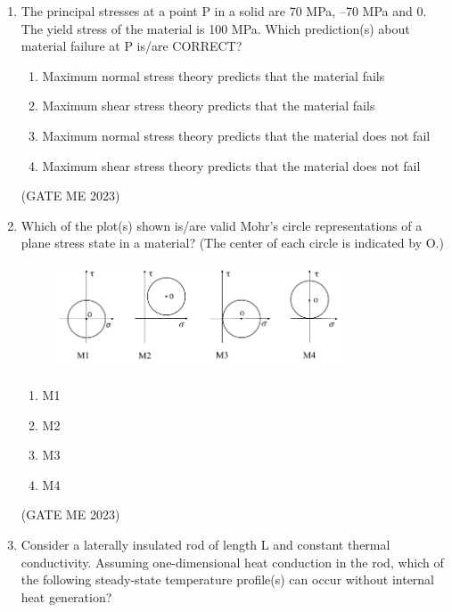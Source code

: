 \documentclass[journal]{IEEEtran}
\begin{document}
\begin{enumerate}
\item The principal stresses at a point P in a solid are 70 MPa, –70 MPa and 0. The yield stress of the material is 100 MPa. Which prediction(s) about material failure at P is/are CORRECT?

\begin{enumerate}
    \item Maximum normal stress theory predicts that the material fails
    \item Maximum shear stress theory predicts that the material fails
    \item Maximum normal stress theory predicts that the material does not fail
    \item Maximum shear stress theory predicts that the material does not fail
\end{enumerate}
\hfill (GATE ME 2023)

\item Which of the plot(s) shown is/are valid Mohr’s circle representations of a plane stress state in a material? (The center of each circle is indicated by O.)
\begin{figure}[H]
\centering
\includegraphics[width=0.8\textwidth]{Fig 20.png}
\caption{}
\label{fig:question27}
\end{figure}

\begin{enumerate}
    \item M1
    \item M2
    \item M3
    \item M4
\end{enumerate}
\hfill (GATE ME 2023)

\item Consider a laterally insulated rod of length L and constant thermal conductivity. Assuming one-dimensional heat conduction in the rod, which of the following steady-state temperature profile(s) can occur without internal heat generation?


\end{enumerate}
\end{document}
